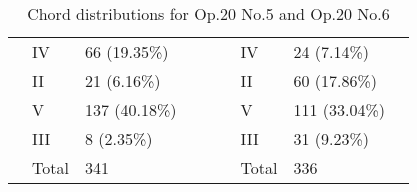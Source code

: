 \begin{table}[]
{\begin{tabular}{|l|l|l|l|l|l|l|l|l|}
 & IV & 66 (19.35\%) &  &  &  & IV & 24 (7.14\%) &  \\ \cline{2-3} \cline{7-8}
 & II & 21 (6.16\%) &  &  &  & II & 60 (17.86\%) &  \\ \cline{2-3} \cline{7-8}
 & V & 137 (40.18\%) &  &  &  & V & 111 (33.04\%) &  \\ \cline{2-3} \cline{7-8}
 & III & 8 (2.35\%) &  &  &  & III & 31 (9.23\%) &  \\ \cline{2-3} \cline{7-8}
 & Total & 341 &  &  &  & Total & 336 &  \\ \cline{1-4} \cline{6-9}
\end{tabular}
}
\caption{Chord distributions for Op.20 No.5 and Op.20 No.6}
\label{table:chord_distribs3}
\end{table}


\newpage
